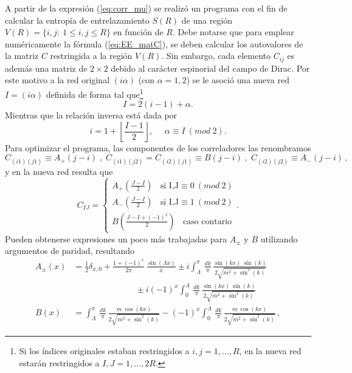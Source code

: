 A partir de la expresión (\ref{eq:corr_mu}) se realizó un programa con el fin de calcular la entropía de entrelazamiento $S(R)$ de una región $V(R)=\{i,j:\: 1\leq i,j \leq R \}$ en función de $R$. Debe notarse que para emplear numéricamente la fórmula (\ref{eq:EE_matC}), se deben calcular los autovalores de la matriz $C$ restringida a la región $V(R)$. Sin embargo, cada elemento $C_{ij}$ es además una matriz de $2 \times 2$ debido al carácter espinorial del campo de Dirac. Por este motivo a la red original $(i \alpha)$ (con $\alpha=1,2$) se le asoció una nueva red $I=(i \alpha)$ definida de forma tal que\footnote{Si los índices originales estaban restringidos a $i,j=1,\ldots,R$, en la nueva red estarán restringidos a $I,J=1, \ldots,2R$.}
\begin{equation}
I=2(i-1)+\alpha.
\end{equation}
Mientras que la relación inversa está dada por
\begin{equation}
i=1+\left \lfloor \frac{I-1}{2}\right \rfloor,\:\:\:\:\:\: \alpha\equiv I \: (mod\:2).
\end{equation}
Para optimizar el programa, las componentes de los correladores las renombramos
\begin{equation}
C_{(i1) (j1)} \equiv A_+(j-i)\;,\;C_{(i1) (j2)}=C_{(i2) (j1)} \equiv B(j-i)\;,\;C_{(i2) (j2)}\equiv A_-(j-i)\,,
\end{equation}
y en la nueva red resulta que 
\begin{equation}
C_{IJ}=
\begin{cases}
A_+(\frac{J-I}{2})\:\:\:\: \text{si I,J}\equiv 0 \:(mod\:2) \\
A_-(\frac{J-I}{2})\:\:\:\: \text{si I,J}\equiv 1 \:(mod\:2) \\
B(\frac{J-I+(-1)^I}{2}) \:\:\:\: \text{caso contario}
\end{cases}.
\end{equation}
Pueden obtenerse expresiones un poco más trabajadas para $A_{\pm}$ y $B$ utilizando argumentos de paridad, resultando
\begin{equation}
\begin{split}
A_\pm(x)&= \frac{1}{2} \delta_{x,0}+\frac{1+(-1)^{x}}{2\pi}\,\frac{\sin (\Lambda x)}{x} \pm i \int_\Lambda^\pi\,\frac{dk}{\pi}\,\frac{\sin(kx)\:\sin (k)}{2 \sqrt{m^2+\sin^2(k) }}\\ &\:\:\:\:\:\:\:\:\:\:\:\:\:\:\:\:\:\:\:\:\:\:\:\:\:\:\:\:\:\:\:\:\:\pm i(-1)^{x}\int_0^\Lambda\,\frac{dk}{\pi}\,\frac{\sin(kx)\: \sin (k)}{2 \sqrt{m^2+\sin^2(k) }} \\
B(x) &= \int_\Lambda^\pi\,\frac{dk}{\pi}\,\frac{m\: \cos(kx)}{2 \sqrt{m^2+\sin^2(k) }}-(-1)^{x}\int_0^\Lambda\,\frac{dk}{\pi}\,\frac{m\: \cos(kx)}{2 \sqrt{m^2+\sin^2(k) }}\, ,
\end{split}
\end{equation}
